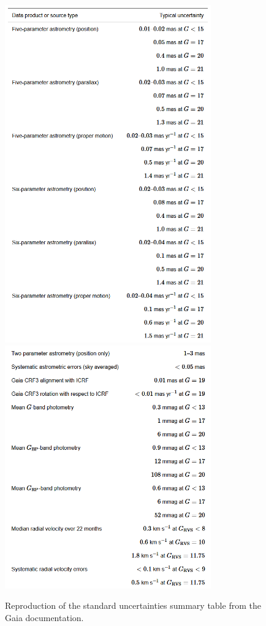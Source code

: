 \documentclass[onecolumn,table,xcdraw,super]{aastex631}
\begin{document}
\begin{figure}[]
    \centering
      \includegraphics[width=3.5in]{figures/gaia_table1.png}
      \includegraphics[width=3.5in]{figures/gaia_table2.png}
    \caption{Reproduction of the standard uncertainties summary table from the Gaia documentation.}
    \label{fig:gaia_table}
\end{figure}
\end{document}
